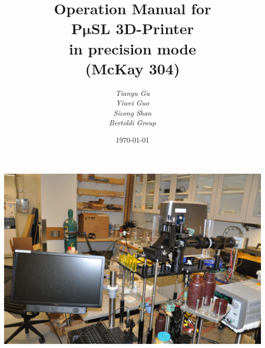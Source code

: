 \documentclass[a4paper]{article}
\title{\textbf{ 
    \Large {Operation Manual for} \\ 
    \vspace {10pt}
    \Huge {P$\bm{\mu}$SL 3D-Printer } \\
    \vspace {10pt}
    \LARGE {in precision mode}	\\
    \vspace {10pt}
    \Large{(McKay 304)}
    \vspace {20pt}
}}
\author{\textit{Tianyu Gu} \\
  \textit{Yiwei Guo}\\
  \textit{Sicong Shan}\\
  \textit{Bertoldi Group}}
\date{\today}
\begin{document}
\maketitle
\vspace{50pt}
\centering
\includegraphics[width=400pt]{mainoverview.JPG}
\pagebreak

\tableofcontents
\pagebreak

\raggedright
\end{document}
